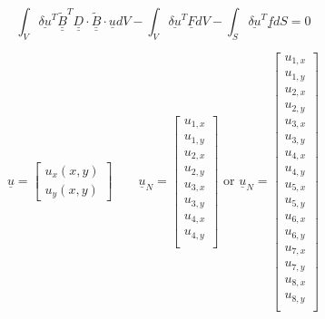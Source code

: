 \documentclass[a4paper]{jpconf}
\begin{document}
\begin{equation}
\int_{V}\underline{\delta u}^{T}\underline{\underline{\widetilde{B}}}^{T}\underline{\underline{D}}\cdot\underline{\underline{\widetilde{B}}}\cdot\underline{u}dV-\int_{V}\underline{\delta u}^{T}\underline{F}dV-\int_{S}\underline{\delta u}^{T}\underline{f}dS=0
\end{equation}


\begin{equation}
\underline{u}=\begin{bmatrix}
u_{x}\left(x,y\right)\\u_{y}\left(x,y\right)
\end{bmatrix}\qquad\underline{u}_{N}=\begin{bmatrix}
u_{1,x}\\u_{1,y}\\u_{2,x}\\u_{2,y}\\u_{3,x}\\u_{3,y}\\u_{4,x}\\u_{4,y}\\
\end{bmatrix}\text{ or }\underline{u}_{N}=\begin{bmatrix}
u_{1,x}\\u_{1,y}\\u_{2,x}\\u_{2,y}\\u_{3,x}\\u_{3,y}\\u_{4,x}\\u_{4,y}\\u_{5,x}\\u_{5,y}\\u_{6,x}\\u_{6,y}\\u_{7,x}\\u_{7,y}\\u_{8,x}\\u_{8,y}\\
\end{bmatrix}
\end{equation}

\end{document}

